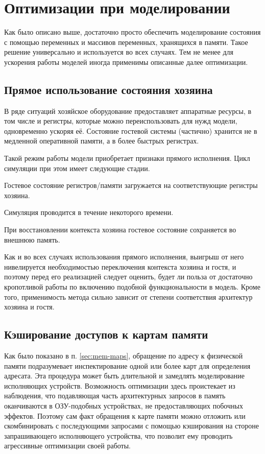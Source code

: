 \section{Оптимизации при моделировании}

Как было описано выше, достаточно просто обеспечить моделирование состояния с помощью переменных и массивов переменных, хранящихся в памяти. Такое решение универсально и используется во всех случаях. Тем не менее для ускорения работы моделей иногда применимы описанные далее оптимизации.

\subsection{Прямое использование состояния хозяина}

В ряде ситуаций хозяйское оборудование предоставляет аппаратные ресурсы, в том числе и регистры, которые можно переиспользовать для нужд модели, одновременно ускоряя её. Состояние гостевой системы (частично) хранится не в медленной оперативной памяти, а в более быстрых регистрах.

Такой режим работы модели приобретает признаки прямого исполнения. Цикл симуляции при этом имеет следующие стадии.

\begin{itemize*}
\item Гостевое состояние регистров/памяти загружается на соответствующие регистры хозяина.
\item Симуляция проводится в течение некоторого времени.
\item При восстановлении контекста хозяина гостевое состояние сохраняется во внешнюю память.
\end{itemize*}

Как и во всех случаях использования прямого исполнения, выигрыш от него нивелируется необходимостью переключения контекста хозяина и гостя, и поэтому перед его реализацией следует оценить, будет ли польза от достаточно кропотливой работы по включению подобной функциональности в модель. Кроме того, применимость метода сильно зависит от степени соответствия архитектур хозяина и гостя.

\subsection{Кэширование доступов к картам памяти}

Как было показано в п. \ref{sec:mem-maps}, обращение по адресу к физической памяти подразумевает инспектирование одной или более карт для определения адресата. Эта процедура может быть длительной и замедлять моделирование исполняющих устройств. Возможность оптимизации здесь проистекает из наблюдения, что подавляющая часть архитектурных запросов в память оканчиваются в ОЗУ-подобных устройствах, не предоставляющих побочных эффектов. Поэтому сам факт обращения к карте памяти можно отложить или скомбинировать с последующими запросами с помощью кэширования на стороне запрашивающего исполняющего устройства, что позволит ему проводить агрессивные оптимизации своей работы.

